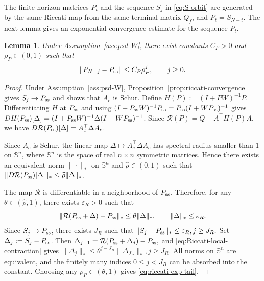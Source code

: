 \documentclass[10pt,journal,twoside]{IEEEtran}
\newtheorem{lemma}{Lemma}
\theoremstyle{definition}
\theoremstyle{remark}
\begin{document}
The finite-horizon matrices \(P_t\) and the sequence \(S_j\) in \eqref{eq:S-orbit} are generated by the same Riccati map from the same terminal matrix \(Q_f\), and $P_t=S_{N-t}$. The next lemma gives an exponential convergence estimate for the sequence $P_t$. 

\begin{lemma}
	\label{lem:riccati-tail-exp}
	Under Assumption~\ref{ass:psd-W}, there exist constants \(C_P>0\) and
	\(\rho_P\in(0,1)\) such that
	\begin{equation}
		\|P_{N-j}-P_{\rm ss}\|\le C_P\rho_P^j,
		\qquad j\ge0 .
		\label{eq:riccati-exp-tail}
	\end{equation}
\end{lemma}

\begin{proof}
	Under Assumption~\ref{ass:psd-W}, Proposition~\ref{prop:riccati-convergence}
		gives \(S_j\to P_{\rm ss}\) and shows that \(A_c\) is Schur.
	Define $H(P):=(I+PW)^{-1}P$.
	Differentiating \(H\) at \(P_{\rm ss}\) and using
	\((I+P_{\rm ss}W)^{-1}P_{\rm ss}=P_{\rm ss}(I+WP_{\rm ss})^{-1}\)
	gives
	$DH(P_{\rm ss})[\Delta]=(I+P_{\rm ss}W)^{-1}\Delta(I+WP_{\rm ss})^{-1}$.
	Since \(\mathcal R(P)=Q+A^\top H(P)A\), we have
		$D\mathcal R(P_{\rm ss})[\Delta]=
		A_c^\top\Delta A_c$.
        
	Since \(A_c\) is Schur, the
	linear map \(\Delta\mapsto A_c^\top\Delta A_c\) has spectral radius smaller
	than $1$ on \(\mathbb S^n\), where \(\mathbb S^n\) is the space of real \(n\times n\) symmetric matrices. Hence there exists an equivalent norm
	\(\|\cdot\|_*\) on \(\mathbb S^n\) and \(\widehat\rho\in(0,1)\) such that
	$\|D\mathcal R(P_{\rm ss})[\Delta]\|_*
		\le
		\widehat\rho\|\Delta\|_*$.
        
	The map \(\mathcal R\) is differentiable in a neighborhood of
	\(P_{\rm ss}\). Therefore, for any \(\theta\in(\widehat\rho,1)\), there
	exists \(\varepsilon_R>0\) such that
	\begin{equation}
		\|\mathcal R(P_{\rm ss}+\Delta)-P_{\rm ss}\|_*
		\le
		\theta\|\Delta\|_*,
		\qquad
		\|\Delta\|_*\le\varepsilon_R .
		\label{eq:Riccati-local-contraction}
	\end{equation}
	Since \(S_j\to P_{\rm ss}\), there exists \(J_R\) such that
	\(
	\|S_j-P_{\rm ss}\|_*\le\varepsilon_R,
	 j\ge J_R .
	\)
	Set \(\Delta_j:=S_j-P_{\rm ss}\). Then
	\(
	\Delta_{j+1}=\mathcal R(P_{\rm ss}+\Delta_j)-P_{\rm ss},
	\)
	and \eqref{eq:Riccati-local-contraction} gives
	\(
	\|\Delta_j\|_*
	\le
	\theta^{j-J_R}\|\Delta_{J_R}\|_*,
	 j\ge J_R .
	\)
	All norms on \(\mathbb S^n\) are equivalent, and the finitely many indices
	\(0\le j<J_R\) can be absorbed into the constant. Choosing any
	\(\rho_P\in(\theta,1)\) gives \eqref{eq:riccati-exp-tail}.
\end{proof}
\end{document}
